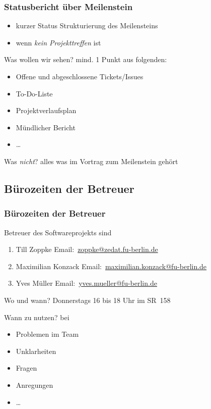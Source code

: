 \documentclass[ucs,9pt]{beamer}
\newcommand{\email}[1]{\href{mailto:#1}{#1}}
\begin{document}
\begin{frame}
    \frametitle{Statusbericht über Meilenstein}
    \begin{itemize}
        \item kurzer Status Strukturierung des Meilensteins
        \item wenn \emph{kein Projekttreffen} ist
    \end{itemize}
        \begin{block}{Was wollen wir sehen?}
            mind. 1 Punkt aus folgenden:
            \begin{itemize}
                \item Offene und abgeschlossene Tickets/Issues
                \item To-Do-Liste
                \item Projektverlaufsplan
                \item Mündlicher Bericht
                \item \dots
            \end{itemize}
        \end{block}
        \begin{block}{Was \emph{nicht}?}
            alles was im Vortrag zum Meilenstein gehört
        \end{block}
\end{frame}

\subsection{Bürozeiten der Betreuer}
\begin{frame}
    \frametitle{Bürozeiten der Betreuer}
    Betreuer des Softwareprojekts sind
    \begin{enumerate}
        \item Till Zoppke Email:~\email{zoppke@zedat.fu-berlin.de}
        \item Maximilian Konzack Email:~\email{maximilian.konzack@fu-berlin.de}
        \item Yves Müller Email:~\email{yves.mueller@fu-berlin.de}
    \end{enumerate}
    \begin{block}{Wo und wann?}
        Donnerstags 16 bis 18 Uhr im SR~158
    \end{block}
    \begin{block}{Wann zu nutzen?}
        bei
        \begin{itemize}
            \item Problemen im Team
            \item Unklarheiten
            \item Fragen
            \item Anregungen
            \item \dots
        \end{itemize}
    \end{block}
\end{frame}
\end{document}
